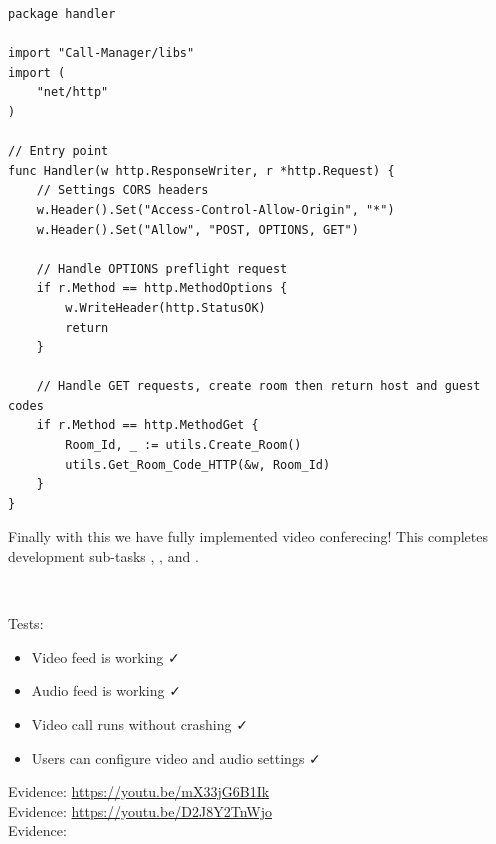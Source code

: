 \begin{verbatim}
package handler

import "Call-Manager/libs"
import (
	"net/http"
)

// Entry point
func Handler(w http.ResponseWriter, r *http.Request) {
	// Settings CORS headers
	w.Header().Set("Access-Control-Allow-Origin", "*")
	w.Header().Set("Allow", "POST, OPTIONS, GET")

	// Handle OPTIONS preflight request
	if r.Method == http.MethodOptions {
		w.WriteHeader(http.StatusOK)
		return
	}

    // Handle GET requests, create room then return host and guest codes
    if r.Method == http.MethodGet {
    	Room_Id, _ := utils.Create_Room()
        utils.Get_Room_Code_HTTP(&w, Room_Id)
    }
}
\end{verbatim}

Finally with this we have fully implemented video conferecing!
This completes development sub-tasks , ,  and
.

{\color{gray} \hrulefill} \\ \vspace{0.2cm}

{\sffamily Tests:}

\begin{itemize}
  \item Video feed is working \faCheck \\
  \item Audio feed is working \faCheck \\
  \item Video call runs without crashing \faCheck \\
  \item Users can configure video and audio settings \faCheck \\
\end{itemize}

{\sffamily Evidence: } \url{https://youtu.be/mX33jG6B1Ik} \\ \vspace{0.2cm}
{\sffamily Evidence: } \url{https://youtu.be/D2J8Y2TnWjo} \\ \vspace{0.2cm}
{\sffamily Evidence: } \url{} \\ \vspace{0.2cm}

{\color{gray} \hrulefill} \\ \vspace{0.2cm}

